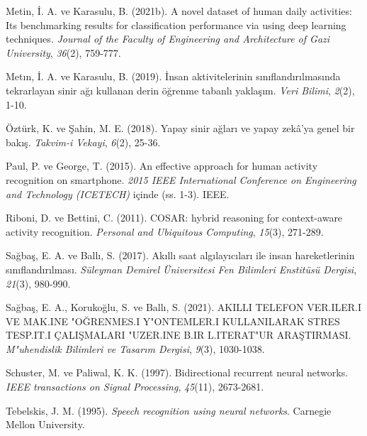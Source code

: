 \documentclass[12pt,twoside]{deuthesis}
\begin{document}
\begin{CSLReferences}{1}{0}
\leavevmode{}%
Metin, İ. A. ve Karasulu, B. (2021b). A novel dataset of human daily activities: Its benchmarking results for classification performance via using deep learning techniques. \emph{Journal of the Faculty of Engineering and Architecture of Gazi University}, \emph{36}(2), 759-777.

\leavevmode{}%
Metın, İ. A. ve Karasulu, B. (2019). {İ}nsan aktivitelerinin s{ı}n{ı}fland{ı}r{ı}lmas{ı}nda tekrarlayan sinir a{ğ}{ı} kullanan derin {ö}{ğ}renme tabanl{ı} yakla{ş}{ı}m. \emph{Veri Bilimi}, \emph{2}(2), 1-10.

\leavevmode{}%
Öztürk, K. ve Şahin, M. E. (2018). Yapay sinir a{ğ}lar{ı} ve yapay zek{â}'ya genel bir bak{ı}{ş}. \emph{Takvim-i Vekayi}, \emph{6}(2), 25-36.

\leavevmode{}%
Paul, P. ve George, T. (2015). An effective approach for human activity recognition on smartphone. \emph{2015 IEEE International Conference on Engineering and Technology (ICETECH)} içinde (ss. 1-3). IEEE.

\leavevmode{}%
Riboni, D. ve Bettini, C. (2011). COSAR: hybrid reasoning for context-aware activity recognition. \emph{Personal and Ubiquitous Computing}, \emph{15}(3), 271-289.

\leavevmode{}%
Sağbaş, E. A. ve Ballı, S. (2017). Ak{ı}ll{ı} saat alg{ı}lay{ı}c{ı}lar{ı} ile insan hareketlerinin s{ı}n{ı}fland{ı}r{ı}lmas{ı}. \emph{S{ü}leyman Demirel {Ü}niversitesi Fen Bilimleri Enstit{ü}s{ü} Dergisi}, \emph{21}(3), 980-990.

\leavevmode{}%
Sağbaş, E. A., Korukoğlu, S. ve Ballı, S. (2021). AKILLI TELEFON VER{.I}LER{.I} VE MAK{.I}NE {"O}{Ğ}RENMES{.I} Y{"O}NTEMLER{.I} KULLANILARAK STRES TESP{.I}T{.I} {Ç}ALI{Ş}MALARI {"U}ZER{.I}NE B{.I}R L{.I}TERAT{"U}R ARA{Ş}TIRMASI. \emph{M{"u}hendislik Bilimleri ve Tasar{ı}m Dergisi}, \emph{9}(3), 1030-1038.

\leavevmode{}%
Schuster, M. ve Paliwal, K. K. (1997). Bidirectional recurrent neural networks. \emph{IEEE transactions on Signal Processing}, \emph{45}(11), 2673-2681.

\leavevmode{}%
Tebelskis, J. M. (1995). \emph{Speech recognition using neural networks}. Carnegie Mellon University.


\end{CSLReferences}
\end{document}
